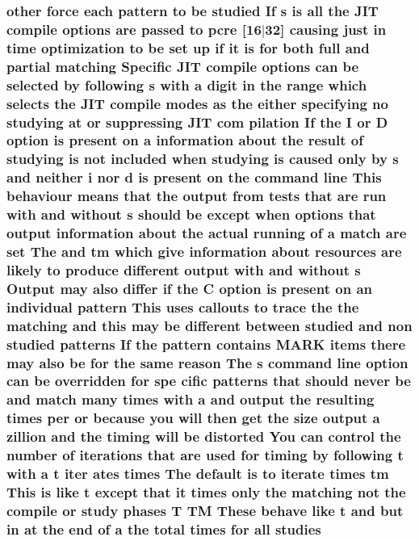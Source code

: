 \subsubsection[{\texorpdfstring{studies}{studies}}]{ other force each {\bf pattern} {\bf to} {\bf be} {\bf studied} If {\bf s} {\bf is} {\bf all} the J\+IT {\bf compile} {\bf options} {\bf are} passed {\bf to} {\bf pcre} \mbox{[}16$\vert$32\mbox{]} causing just {\bf in} {\bf time} optimization {\bf to} {\bf be} {\bf set} up {\bf if} {\bf it} {\bf is} for both full and {\bf partial} {\bf matching} Specific J\+IT {\bf compile} {\bf options} {\bf can} {\bf be} {\bf selected} by following {\bf s} {\bf with} {\bf a} digit {\bf in} the range {\bf which} selects the J\+IT {\bf compile} {\bf modes} {\bf as} the either {\bf specifying} no {\bf studying} at {\bf or} suppressing J\+IT com pilation If the {\bf I} {\bf or} {\bf D} {\bf option} {\bf is} {\bf present} {\bf on} {\bf a} information about the {\bf result} {\bf of} {\bf studying} {\bf is} {\bf not} {\bf included} when {\bf studying} {\bf is} caused only by {\bf s} and neither {\bf i} nor {\bf d} {\bf is} {\bf present} {\bf on} the {\bf command} {\bf line} This behaviour means that the {\bf output} {\bf from} {\bf tests} that {\bf are} {\bf run} {\bf with} and without {\bf s} should {\bf be} {\bf except} when {\bf options} that {\bf output} information about the actual running {\bf of} {\bf a} {\bf match} {\bf are} {\bf set} The and {\bf tm} {\bf which} give information about resources {\bf are} likely {\bf to} produce different {\bf output} {\bf with} and without {\bf s} Output may also differ {\bf if} the {\bf C} {\bf option} {\bf is} {\bf present} {\bf on} an individual {\bf pattern} This uses callouts {\bf to} trace the the {\bf matching} and {\bf this} may {\bf be} different between {\bf studied} and non {\bf studied} {\bf patterns} If the {\bf pattern} {\bf contains} M\+A\+RK items there may also {\bf be} for the same {\bf reason} The {\bf s} {\bf command} {\bf line} {\bf option} {\bf can} {\bf be} overridden for spe cific {\bf patterns} that should never {\bf be} and {\bf match} many {\bf times} {\bf with} {\bf a} and {\bf output} the resulting {\bf times} per {\bf or} because you will then get the {\bf size} {\bf output} {\bf a} zillion and the timing will {\bf be} distorted You {\bf can} control the {\bf number} {\bf of} iterations that {\bf are} {\bf used} for timing by following {\bf t} {\bf with} {\bf a} {\bf t} {\bf iter} ates {\bf times} The {\bf default} {\bf is} {\bf to} iterate {\bf times} {\bf tm} This {\bf is} like {\bf t} {\bf except} that {\bf it} {\bf times} only the {\bf matching} {\bf not} the {\bf compile} {\bf or} {\bf study} phases {\bf T} TM These behave like {\bf t} and but {\bf in} at the {\bf end} {\bf of} {\bf a} the total {\bf times} for {\bf all} studies}\hypertarget{pcretest_8txt_a0138ef3c2974f425be93d7246021a8b0}{}\label{pcretest_8txt_a0138ef3c2974f425be93d7246021a8b0}
